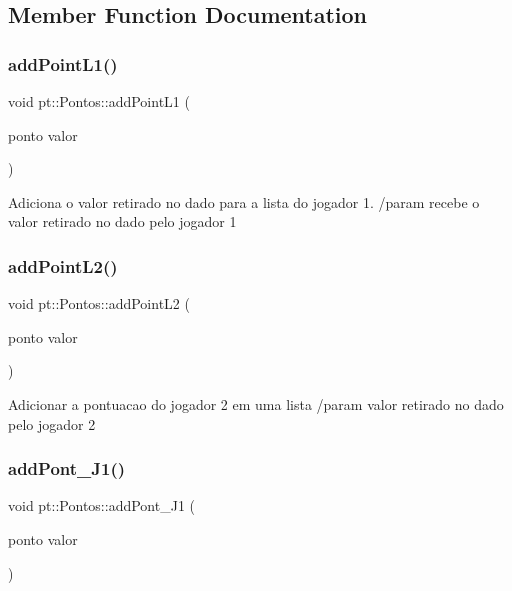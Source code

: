 \subsection{Member Function Documentation}
\mbox{\label{structpt_1_1Pontos_a13e9f6685a883eabdb05e532e5bd632f}} 
\subsubsection{\texorpdfstring{add\+Point\+L1()}{addPointL1()}}
{\footnotesize\ttfamily void pt\+::\+Pontos\+::add\+Point\+L1 (\begin{DoxyParamCaption}\item[{ponto}]{valor }\end{DoxyParamCaption})\hspace{0.3cm}{\ttfamily [inline]}}

Adiciona o valor retirado no dado para a lista do jogador 1. /param recebe o valor retirado no dado pelo jogador 1 \mbox{\label{structpt_1_1Pontos_af20c5c6ab9387cbb281e60e88464ea87}} 
\subsubsection{\texorpdfstring{add\+Point\+L2()}{addPointL2()}}
{\footnotesize\ttfamily void pt\+::\+Pontos\+::add\+Point\+L2 (\begin{DoxyParamCaption}\item[{ponto}]{valor }\end{DoxyParamCaption})\hspace{0.3cm}{\ttfamily [inline]}}

Adicionar a pontuacao do jogador 2 em uma lista /param valor retirado no dado pelo jogador 2 \mbox{\label{structpt_1_1Pontos_a1aa7214c09d37c3e6091d65abf9dd8e2}} 
\subsubsection{\texorpdfstring{add\+Pont\+\_\+\+J1()}{addPont\_J1()}}
{\footnotesize\ttfamily void pt\+::\+Pontos\+::add\+Pont\+\_\+\+J1 (\begin{DoxyParamCaption}\item[{ponto}]{valor }\end{DoxyParamCaption})\hspace{0.3cm}{\ttfamily [inline]}}

